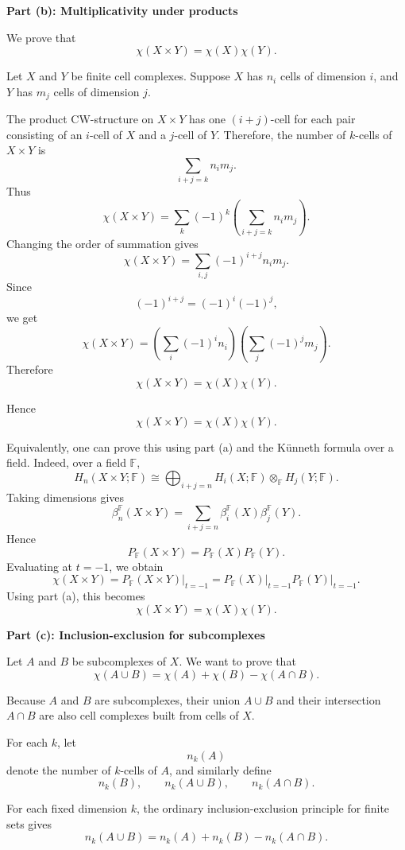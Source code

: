 \begin{solution}
\medskip
\noindent\textbf{Part (b): Multiplicativity under products}\par
\smallskip


We prove that
\[
\chi(X\times Y)=\chi(X)\chi(Y).
\]

Let \(X\) and \(Y\) be finite cell complexes. Suppose \(X\) has \(n_i\) cells of dimension \(i\), and \(Y\) has \(m_j\) cells of dimension \(j\).

The product CW-structure on \(X\times Y\) has one \((i+j)\)-cell for each pair consisting of an \(i\)-cell of \(X\) and a \(j\)-cell of \(Y\). Therefore, the number of \(k\)-cells of \(X\times Y\) is
\[
\sum_{i+j=k} n_i m_j.
\]
Thus
\[
\chi(X\times Y)
=
\sum_k (-1)^k
\left(
\sum_{i+j=k} n_i m_j
\right).
\]
Changing the order of summation gives
\[
\chi(X\times Y)
=
\sum_{i,j} (-1)^{i+j}n_i m_j.
\]
Since
\[
(-1)^{i+j}=(-1)^i(-1)^j,
\]
we get
\[
\chi(X\times Y)
=
\left(\sum_i (-1)^i n_i\right)
\left(\sum_j (-1)^j m_j\right).
\]
Therefore
\[
\chi(X\times Y)=\chi(X)\chi(Y).
\]

Hence
\[
\boxed{\chi(X\times Y)=\chi(X)\chi(Y).}
\]

Equivalently, one can prove this using part (a) and the Künneth formula over a field. Indeed, over a field \(\mathbb F\),
\[
H_n(X\times Y;\mathbb F)
\cong
\bigoplus_{i+j=n}
H_i(X;\mathbb F)\otimes_{\mathbb F}H_j(Y;\mathbb F).
\]
Taking dimensions gives
\[
\beta_n^{\mathbb F}(X\times Y)
=
\sum_{i+j=n}
\beta_i^{\mathbb F}(X)\beta_j^{\mathbb F}(Y).
\]
Hence
\[
P_{\mathbb F}(X\times Y)
=
P_{\mathbb F}(X)P_{\mathbb F}(Y).
\]
Evaluating at \(t=-1\), we obtain
\[
\chi(X\times Y)
=
P_{\mathbb F}(X\times Y)\big|_{t=-1}
=
P_{\mathbb F}(X)\big|_{t=-1}
P_{\mathbb F}(Y)\big|_{t=-1}.
\]
Using part (a), this becomes
\[
\chi(X\times Y)=\chi(X)\chi(Y).
\]


\medskip
\noindent\textbf{Part (c): Inclusion-exclusion for subcomplexes}\par
\smallskip


Let \(A\) and \(B\) be subcomplexes of \(X\). We want to prove that
\[
\chi(A\cup B)=\chi(A)+\chi(B)-\chi(A\cap B).
\]

Because \(A\) and \(B\) are subcomplexes, their union \(A\cup B\) and their intersection \(A\cap B\) are also cell complexes built from cells of \(X\).

For each \(k\), let
\[
n_k(A)
\]
denote the number of \(k\)-cells of \(A\), and similarly define
\[
n_k(B),
\qquad
n_k(A\cup B),
\qquad
n_k(A\cap B).
\]

For each fixed dimension \(k\), the ordinary inclusion-exclusion principle for finite sets gives
\[
n_k(A\cup B)
=
n_k(A)+n_k(B)-n_k(A\cap B).
\]


\end{solution}
